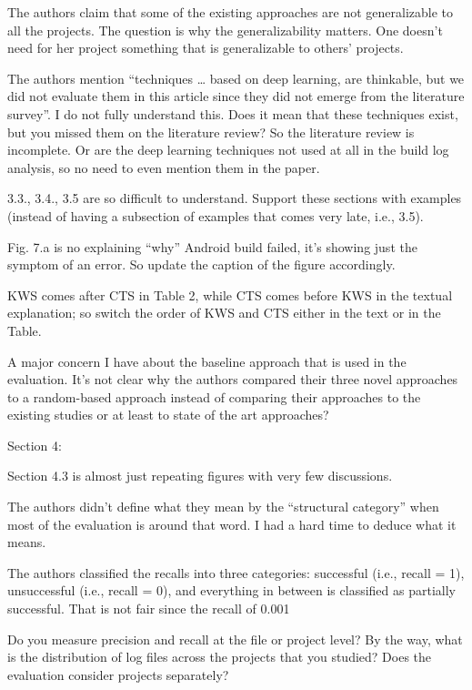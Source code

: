\documentclass[10pt,a4wide]{article}
\renewenvironment{leftbar}{%
	\vspace{0.1cm}
	\def\FrameCommand{\vrule width 0.4pt \hspace{15pt}}%
	\MakeFramed {\advance\hsize-\width \FrameRestore}}%
{\endMakeFramed\vspace{0.1cm}}
\begin{document}
\begin{leftbar}
The authors claim that some of the existing approaches are not generalizable to all the projects. The question is why the generalizability matters. One doesn’t need for her project something that is generalizable to others’ projects.

The authors mention “techniques … based on deep learning, are thinkable, but we did not evaluate them in this article since they did not emerge from the literature survey”. I do not fully understand this. Does it mean that these techniques exist, but you missed them on the literature review? So the literature review is incomplete. Or are the deep learning techniques not used at all in the build log analysis, so no need to even mention them in the paper.

3.3., 3.4., 3.5 are so difficult to understand. Support these sections with examples (instead of having a subsection of examples that comes very late, i.e., 3.5).

Fig. 7.a is no explaining “why” Android build failed, it’s showing just the symptom of an error. So update the caption of the figure accordingly.

KWS comes after CTS in Table 2, while CTS comes before KWS in the textual explanation; so switch the order of KWS and CTS either in the text or in the Table.

A major concern I have about the baseline approach that is used in the evaluation. It’s not clear why the authors compared their three novel approaches to a random-based approach instead of comparing their approaches to the existing studies or at least to state of the art approaches?

Section 4:

Section 4.3 is almost just repeating figures with very few discussions.

The authors didn’t define what they mean by the “structural category” when most of the evaluation is around that word. I had a hard time to deduce what it means.

The authors classified the recalls into three categories: successful (i.e., recall = 1), unsuccessful (i.e., recall = 0), and everything in between is classified as partially successful. That is not fair since the recall of 0.001%

Do you measure precision and recall at the file or project level? By the way, what is the distribution of log files across the projects that you studied? Does the evaluation consider projects separately?


\end{leftbar}
\end{document}
